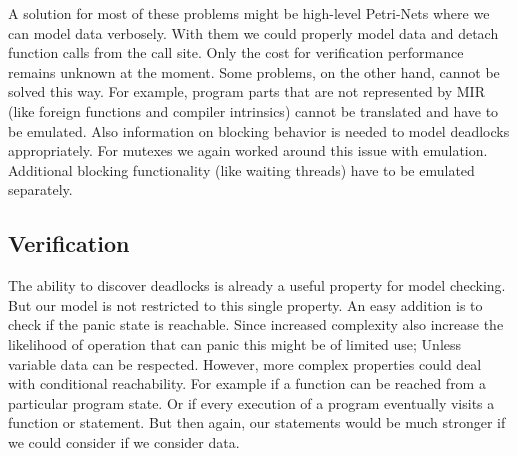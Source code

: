 A solution for most of these problems might be high-level Petri-Nets where we can model data verbosely.
With them we could properly model data and detach function calls from the call site.
Only the cost for verification performance remains unknown at the moment.
Some problems, on the other hand, cannot be solved this way.
For example, program parts that are not represented by MIR (like foreign functions and compiler intrinsics) cannot be translated and have to be emulated.
Also information on blocking behavior is needed to model deadlocks appropriately.
For mutexes we again worked around this issue with emulation.
Additional blocking functionality (like waiting threads) have to be emulated separately.

\subsection{Verification}
The ability to discover deadlocks is already a useful property for model checking.
But our model is not restricted to this single property.
An easy addition is to check if the panic state is reachable.
Since increased complexity also increase the likelihood of operation that can panic this might be of limited use;
Unless variable data can be respected.
However, more complex properties could deal with conditional reachability.
For example if a function can be reached from a particular program state.
Or if every execution of a program eventually visits a function or statement.
But then again, our statements would be much stronger if we could consider if we consider data.
